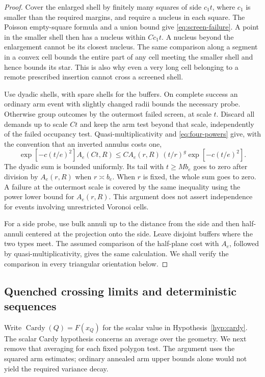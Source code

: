 \begin{proof}
Cover the enlarged shell by finitely many squares of side $c_1t$,
where $c_1$ is smaller than the required margins, and require a
nucleus in each square.  The Poisson empty-square formula and a
union bound give \eqref{eq:screen-failure}.  A point in the smaller
shell then has a nucleus within $C c_1t$.  A nucleus beyond the
enlargement cannot be its closest nucleus.  The same comparison
along a segment in a convex cell bounds the entire part of any
cell meeting the smaller shell and hence bounds its star.  This is
also why even a very long cell belonging to a remote prescribed
insertion cannot cross a screened shell.

Use dyadic shells, with spare shells for the buffers.  On complete
success an ordinary arm event with slightly changed radii bounds
the necessary probe.  Otherwise group outcomes by the outermost
failed screen, at scale $t$.  Discard all demands up to scale $Ct$
and keep the arm test beyond that scale, independently of the
failed occupancy test.  Quasi-multiplicativity and
\eqref{eq:four-powers} give, with the convention that an inverted
annulus costs one,
\[
 \exp[-c(t/e)^2]A_e(Ct,R)
 \le C A_e(r,R)\,(t/r)^g\exp[-c(t/e)^2].
\]
The dyadic sum is bounded uniformly.  Its tail with $t\ge Mb_e$
goes to zero after division by $A_e(r,R)$ when $r\asymp b_e$.
When $r$ is fixed, the whole sum goes to zero.  A failure at the
outermost scale is covered by the same inequality using the power
lower bound for $A_e(r,R)$.  This argument does not assert
independence for events involving unrestricted Voronoi cells.

For a side probe, use bulk annuli up to the distance from the side
and then half-annuli centered at the projection onto the side.
Leave disjoint buffers where the two types meet.  The assumed
comparison of the half-plane cost with $A_e$, followed by
quasi-multiplicativity, gives the same calculation.  We shall verify
the comparison in every triangular orientation below.
\end{proof}

\subsection{Quenched crossing limits and deterministic sequences}

Write $\operatorname{Cardy}(Q)=F(x_Q)$ for the scalar value in
Hypothesis~\ref{hyp:cardy}.  The scalar Cardy hypothesis concerns
an average over the geometry.
We next remove that averaging for each fixed polygon test.  The
argument uses the squared arm estimates; ordinary annealed arm
upper bounds alone would not yield the required variance decay.

